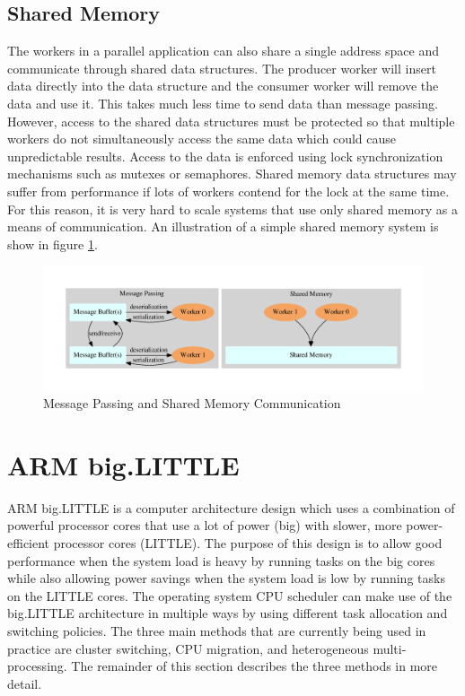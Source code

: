 \documentclass[11pt]{book}
\begin{document}
\subsection{Shared Memory}

The workers in a parallel application can also share a single address space and communicate
through shared data structures. The producer worker will insert data directly into the data
structure and the consumer worker will remove the data and use it. This takes much less time
to send data than message passing. However, access to the shared data structures must be
protected so that multiple workers do not simultaneously access the same data which could
cause unpredictable results. Access to the data is enforced using lock synchronization
mechanisms such as mutexes or semaphores. Shared memory data structures may suffer from
performance if lots of workers contend for the lock at the same time. For this reason, it
is very hard to scale systems that use only shared memory as a means of communication. An
illustration of a simple shared memory system is show in figure \ref{communication}.

\begin{figure}[H]
    \centering
    \includegraphics[width=\textwidth]{figs/graphviz/parallel_communication.pdf}
    \caption{Message Passing and Shared Memory Communication}\label{communication}
\end{figure}

\section{ARM big.LITTLE}

ARM big.LITTLE is a computer architecture design which uses a combination of powerful
processor cores that use a lot of power (big) with slower, more power-efficient processor
cores (LITTLE). The purpose of this design is to allow good performance when the system load
is heavy by running tasks on the big cores while also allowing power savings when the system
load is low by running tasks on the LITTLE cores. The operating system CPU scheduler can
make use of the big.LITTLE architecture in multiple ways by using different task allocation
and switching policies. The three main methods that are currently being used in practice
are cluster switching, CPU migration, and heterogeneous multi-processing. The remainder of
this section describes the three methods in more detail.
\end{document}

